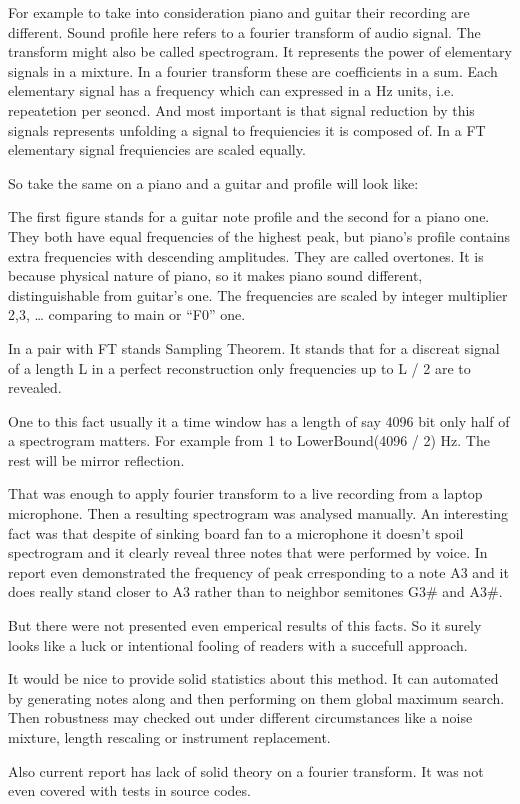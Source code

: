 \documentclass[oneside, final, 14pt]{extarticle}
\begin{document}
For example to take into consideration piano and guitar their recording are
different. Sound profile here refers to a fourier transform of audio signal.
The transform might also be called spectrogram. It represents the power of
elementary signals in a mixture. In a fourier transform these are coefficients
in a sum. Each elementary signal has a frequency which can expressed in a Hz
units, i.e. repeatetion per seoncd. And most important is that signal reduction
by this signals represents unfolding a signal to frequiencies it is composed
of. In a FT elementary signal frequiencies are scaled equally.

So take the same on a piano and a guitar and profile will look like:






The first figure stands for a guitar note profile and the second for a piano
one.  They both have equal frequencies of the highest peak, but piano's profile
contains extra frequencies with descending amplitudes. They are called
overtones. It is because physical nature of piano, so it makes piano sound
different, distinguishable from guitar's one. The frequencies are scaled by
integer multiplier 2,3, … comparing to main or “F0” one.

In a pair with FT stands Sampling Theorem. It stands that for a discreat signal
of a length L in a perfect reconstruction only frequencies up to L / 2 are to
revealed.

One to this fact usually it a time window has a length of say 4096 bit only
half of a spectrogram matters. For example from 1 to LowerBound(4096 / 2) Hz.
The rest will be mirror reflection.

That was enough to apply fourier transform to a live recording from a laptop
microphone. Then a resulting spectrogram was analysed manually. An interesting
fact was that despite of sinking board fan to a microphone it doesn't spoil
spectrogram and it clearly reveal three notes that were performed by voice. In
report even demonstrated the frequency of peak crresponding to a note A3 and it
does really stand closer to A3 rather than to neighbor semitones G3\# and A3\#.

But there were not presented even emperical results of this facts. So it surely
looks like a luck or intentional fooling of readers with a succefull approach.

It would be nice to provide solid statistics about this method. It can
automated by generating notes along and then performing on them global maximum
search. Then robustness may checked out under different circumstances like a
noise mixture, length rescaling or instrument replacement.

Also current report has lack of solid theory on a fourier transform. It was not
even covered with tests in source codes.
\end{document}
